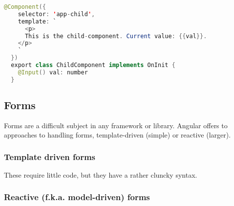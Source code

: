 \begin{lstlisting}[language=java, caption=Child]
  @Component({
    selector: 'app-child',
    template: `
      <p>
      This is the child-component. Current value: {{val}}.
    </p>
    `
  })
  export class ChildComponent implements OnInit { 
    @Input() val: number
  }
\end{lstlisting}

\subsection{Forms}
Forms are a difficult subject in any framework or library. Angular offers to approaches to handling forms, template-driven (simple) or reactive (larger).

\subsubsection{Template driven forms}
These require little code, but they have a rather cluncky syntax.

\subsubsection{Reactive (f.k.a. model-driven) forms}

